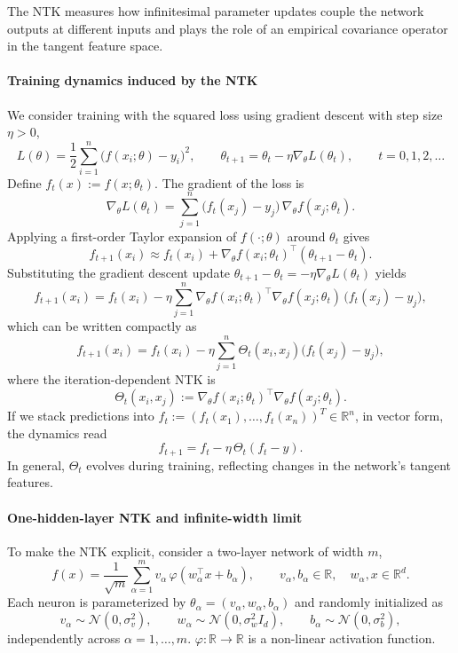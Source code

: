 The NTK measures how infinitesimal parameter updates couple the network outputs
at different inputs and plays the role of an empirical covariance operator in
the tangent feature space.

\paragraph{Training dynamics induced by the NTK}

We consider training with the squared loss using gradient descent with step size $\eta>0$,
\[
	L(\theta) = \frac{1}{2}\sum_{i=1}^n \bigl(f(x_i;\theta) - y_i\bigr)^2,
	\qquad \theta_{t+1} = \theta_t - \eta \nabla_\theta L(\theta_t),
	\qquad t = 0,1,2,\dots
\]
Define $f_t(x) := f(x;\theta_t)$. The gradient of the loss is
\[
	\nabla_\theta L(\theta_t)
	=
	\sum_{j=1}^n \bigl(f_t(x_j)-y_j\bigr)\,\nabla_\theta f(x_j;\theta_t).
\]
Applying a first-order Taylor expansion of $f(\cdot;\theta)$ around $\theta_t$
gives
\[
	f_{t+1}(x_i)
	\approx
	f_t(x_i)
	+
	\nabla_\theta f(x_i;\theta_t)^\top(\theta_{t+1}-\theta_t).
\]
Substituting the gradient descent update
$\theta_{t+1}-\theta_t = -\eta \nabla_\theta L(\theta_t)$
yields
\[
	f_{t+1}(x_i)
	=
	f_t(x_i)
	-
	\eta
	\sum_{j=1}^n
	\nabla_\theta f(x_i;\theta_t)^\top
	\nabla_\theta f(x_j;\theta_t)\,
	\bigl(f_t(x_j)-y_j\bigr),
\]
which can be written compactly as
\begin{equation}
	f_{t+1}(x_i)
	=
	f_t(x_i)
	-
	\eta
	\sum_{j=1}^n
	\Theta_t(x_i,x_j)\bigl(f_t(x_j)-y_j\bigr),
	\label{eq:ntk-prediction-dynamics}
\end{equation}
where the iteration-dependent NTK is
\[
	\Theta_t(x_i,x_j)
	:=
	\nabla_\theta f(x_i;\theta_t)^\top
	\nabla_\theta f(x_j;\theta_t).
\]
If we stack predictions into
$f_t := (f_t(x_1),\dots,f_t(x_n))^T \in \mathbb{R}^n$, in vector form, the dynamics read
\begin{equation}
	f_{t+1} = f_t - \eta\,\Theta_t (f_t - y).
	\label{eq:ntk-vector-dynamics}
\end{equation}
In general, $\Theta_t$ evolves during training, reflecting changes in the
network’s tangent features.

\paragraph{One-hidden-layer NTK and infinite-width limit}

To make the NTK explicit, consider a two-layer network of width $m$,
\begin{equation}
	f(x)
	=
	\frac{1}{\sqrt{m}}
	\sum_{\alpha=1}^m
	v_\alpha\,\varphi(w_\alpha^\top x + b_\alpha),
	\qquad
	v_\alpha, b_\alpha \in \mathbb{R}, \quad w_\alpha, x \in \mathbb{R}^d.
	\label{eq:1hl-network}
\end{equation}
Each neuron is parameterized by $\theta_\alpha = (v_\alpha,w_\alpha,b_\alpha)$ and
randomly initialized as
\[
	v_\alpha \sim \mathcal{N}(0,\sigma_v^2),
	\qquad
	w_\alpha \sim \mathcal{N}\!\left(0,\sigma_w^2I_d\right),
	\qquad
	b_\alpha \sim \mathcal{N}(0,\sigma_b^2),
\]
independently across $\alpha = 1,\dots,m$. $\varphi: \mathbb{R} \to \mathbb{R}$ is a non-linear activation function.

